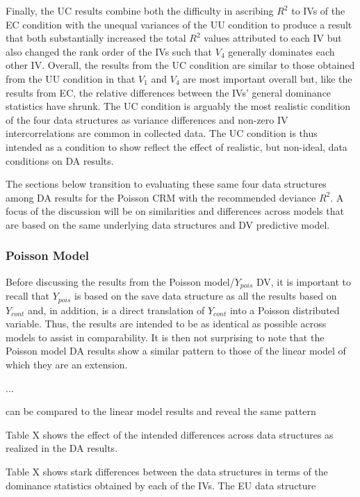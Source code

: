 \documentclass[ShortAfour,times,sageapa]{sagej}
\begin{document}
	Finally, the UC results combine both the difficulty in ascribing $R^2$ to IVs of the EC condition with the unequal variances of the UU condition to produce a result that both substantially increased the total $R^2$ values attributed to each IV but also changed the rank order of the IVs such that $V_4$ generally dominates each other IV.
	Overall, the results from the UC condition are similar to those obtained from the UU condition in that $V_1$ and $V_4$ are most important overall but, like the results from EC, the relative differences between the IVs' general dominance statistics have shrunk.
	The UC condition is arguably the most realistic condition of the four data structures as variance differences and non-zero IV intercorrelations are common in collected data.
	The UC condition is thus intended as a condition to show reflect the effect of realistic, but non-ideal, data conditions on DA results.
	
	The sections below transition to evaluating these same four data structures among DA results for the Poisson CRM with the recommended deviance $R^2$.  
	A focus of the discussion will be on similarities and differences across models that are based on the same underlying data structures and DV predictive model.
	
	\subsubsection{Poisson Model}
	
	Before discussing the results from the Poisson model/$Y_{pois}$ DV, it is important to recall that $Y_{pois}$ is based on the save data structure as all the results based on $Y_{cont}$ and, in addition, is a direct translation of $Y_{cont}$ into a Poisson distributed variable. 
	Thus, the results are intended to be as identical as possible across models to assist in comparability.
	It is then not surprising to note that the Poisson model DA results show a similar pattern to those of the linear model of which they are an extension.
	
	...
	
	can be compared to the linear model results and reveal the same pattern
	
	Table X shows the effect of the intended differences across data structures as realized in the DA results.
	
	Table X shows stark differences between the data structures in terms of the dominance statistics obtained by each of the IVs.  The EU data structure
	
\end{document}
